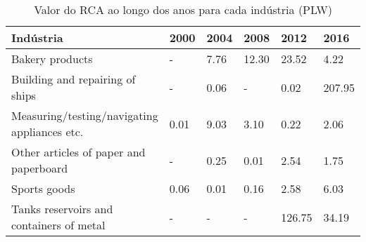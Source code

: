 \begin{table}
\centering
\caption{Valor do RCA ao longo dos anos para cada indústria (PLW)}
\begin{tabular}{p{6cm}p{1.5cm}p{1.5cm}p{1.5cm}p{1.5cm}p{1.5cm}}
\toprule
                                   Indústria & 2000 & 2004 &  2008 &   2012 &   2016 \\
\midrule
                             Bakery products &    - & 7.76 & 12.30 &  23.52 &   4.22 \\
             Building and repairing of ships &    - & 0.06 &     - &   0.02 & 207.95 \\
Measuring/testing/navigating appliances etc. & 0.01 & 9.03 &  3.10 &   0.22 &   2.06 \\
      Other articles of paper and paperboard &    - & 0.25 &  0.01 &   2.54 &   1.75 \\
                                Sports goods & 0.06 & 0.01 &  0.16 &   2.58 &   6.03 \\
    Tanks reservoirs and containers of metal &    - &    - &     - & 126.75 &  34.19 \\
\bottomrule
\end{tabular}
\end{table}
